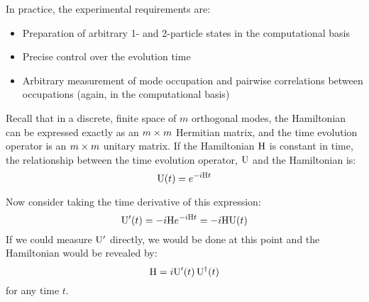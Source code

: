 In practice, the experimental requirements are:
\begin{itemize}
  \item Preparation of arbitrary 1- and 2-particle states in the computational
  basis
  \item Precise control over the evolution time
  \item Arbitrary measurement of mode occupation and pairwise correlations
  between occupations (again, in the computational basis)
\end{itemize}

Recall that in a discrete, finite space of \(m\) orthogonal modes, the
Hamiltonian can be expressed exactly as an \(m \times m\) Hermitian matrix, and the
time evolution operator is an \(m \times m\) unitary matrix. If the Hamiltonian
\(\mathrm{H}\) is constant in time, the relationship between the time evolution
operator, \(\mathrm{U}\) and the Hamiltonian is:
\begin{equation}
  \label{eq:exponential}
  \mathrm{U} \!\left(t\right) = e^{-i \mathrm{H} t}
\end{equation}

Now consider taking the time derivative of this expression:
\begin{equation}
  \mathrm{U}^{\prime} \!\left(t\right) = -i \mathrm{H} e^{-i \mathrm{H} t} = -i \mathrm{H} \mathrm{U}
  \!\left(t\right)
\end{equation}
If we could measure \(\mathrm{U}^{\prime}\) directly, we would be done at this
point and the Hamiltonian would be revealed by:
\begin{equation}
  \mathrm{H} = i \mathrm{U}^{\prime} \!\left(t\right) \mathrm{U}^{\dagger} \!\left(t\right)
\end{equation}
for any time \(t\).

